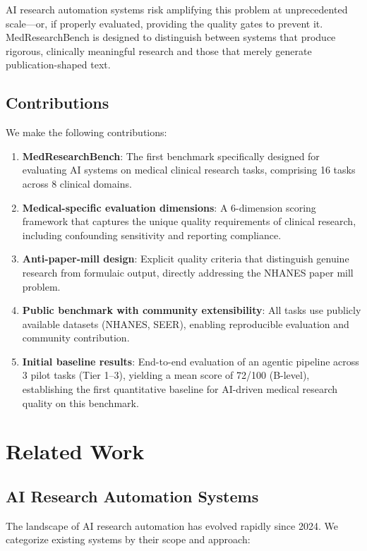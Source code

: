 \documentclass[12pt]{article}
\begin{document}
AI research automation systems risk amplifying this problem at unprecedented scale---or, if properly evaluated, providing the quality gates to prevent it. MedResearchBench is designed to distinguish between systems that produce rigorous, clinically meaningful research and those that merely generate publication-shaped text.

\subsection{Contributions}

We make the following contributions:

\begin{enumerate}
\item \textbf{MedResearchBench}: The first benchmark specifically designed for evaluating AI systems on medical clinical research tasks, comprising 16 tasks across 8 clinical domains.
\item \textbf{Medical-specific evaluation dimensions}: A 6-dimension scoring framework that captures the unique quality requirements of clinical research, including confounding sensitivity and reporting compliance.
\item \textbf{Anti-paper-mill design}: Explicit quality criteria that distinguish genuine research from formulaic output, directly addressing the NHANES paper mill problem.
\item \textbf{Public benchmark with community extensibility}: All tasks use publicly available datasets (NHANES, SEER), enabling reproducible evaluation and community contribution.
\item \textbf{Initial baseline results}: End-to-end evaluation of an agentic pipeline across 3 pilot tasks (Tier 1--3), yielding a mean score of 72/100 (B-level), establishing the first quantitative baseline for AI-driven medical research quality on this benchmark.
\end{enumerate}

\section{Related Work}

\subsection{AI Research Automation Systems}

The landscape of AI research automation has evolved rapidly since 2024. We categorize existing systems by their scope and approach:
\end{document}
